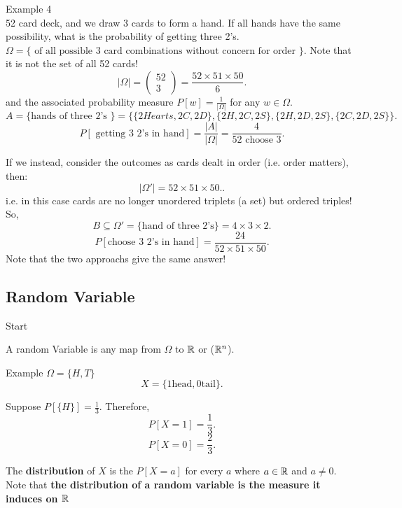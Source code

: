 \documentclass[a4paper]{article}
\begin{document}
\begin{note}{Example 4} \\
  52 card deck, and we draw 3 cards to form a hand. If all hands have the same possibility, what is the probability of getting 
  three 2's. \\

  $\Omega = \{ \text{ of all possible 3 card combinations without concern for order } \}$. Note that it is not the set 
  of all 52 cards! 
  \[
   |\Omega| = \begin{pmatrix} 52 \\ 3 \end{pmatrix} = \frac{52 \times 51 \times 50}{6}
  .\] 
  and the associated probability measure $P[w] = \frac{1}{|\Omega|}$ for any $w \in \Omega$. 
  \[
    A = \{ \text{hands of three 2's } \} = \{ \{2Hearts, 2C, 2D \}, \{2H, 2C, 2S\}, \{2H, 2D, 2S\}, \{2C, 2D, 2S\} \}
  .\] 
  \[
  P[\text{ getting 3 2's in hand} ] = \frac{|A|}{|\Omega|} = \frac{4}{\text{52 choose 3}}
  .\] 

  If we instead, consider the outcomes as cards dealt in order (i.e. order matters), then:
  \[
  |\Omega'| = 52 \times 51 \times 50. 
  .\] 
  i.e. in this case cards are no longer unordered triplets (a set) but ordered triples! So,
  \[
    B \subseteq \Omega' = \{ \text{hand of three 2's} \} = 4 \times 3 \times 2
  .\] 
  \[
    P[\text{choose 3 2's in hand}] = \frac{24}{52 \times 51 \times 50}
  .\] 
  Note that the two approachs give the same answer!
\end{note}

\subsection{Random Variable}
Start
\begin{definition}
 A random Variable is any map from $\Omega$ to $\mathbb{R}$ or ($\mathbb{R}^n$). 
\end{definition}

\begin{note}{Example}
  $\Omega = \{ H, T\} $
   \[
     X = \{1 \text{head}, 0 \text{tail} \} 
   .\] 
  
   Suppose $P[\{H\}] = \frac{1}{3}$. Therefore,
   \[
     P[X=1] = \frac{1}{3}
   .\] 
   \[
     P[X=0] = \frac{2}{3}
   .\] 
\end{note}
\begin{definition}
  The \textbf{distribution} of $X$ is the $P[X = a]$ for every $a$ where $a \in \mathbb{R}$ and $a \neq 0$. 
  Note that \textbf{the distribution of a random variable is the measure it induces on $\mathbb{R}$}
\end{definition}
\end{document}
